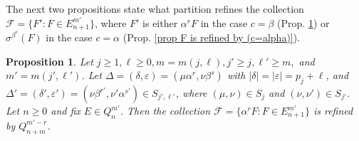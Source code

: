 \documentclass[12pt]{amsart}
\newcommand{\mc}[1]{\mathcal{#1}}
\newcommand{\al}{\alpha}
\newcommand{\be}{\beta}
\newcommand{\de}{\delta}
\newcommand{\De}{\Delta}
\newcommand{\ep}{\varepsilon}
\newcommand{\si}{\sigma}
\theoremstyle{plain} %
\newtheorem{Proposition}[Theorem]{Proposition}
\theoremstyle{definition} %
\begin{document}
The next two propositions state what partition refines the collection $\mc{F} = \{ F' : F \in E_{n+1}^{m'} \}$, where $F'$ is either $\al^r F$ in the case $c = \be$ (Prop. \ref{prop F is refined by (c=beta)}) or $\si^{\be^s} (F)$  in the case $c = \al$ (Prop. \ref{prop F is refined by (c=alpha)}).

\begin{Proposition}\label{prop F is refined by (c=beta)}
    Let $j \geq 1, \ell \geq 0, m = m(j,\ell), j' \geq j, \ell' \ge m,$ and $m' = m(j', \ell')$. Let $\De = (\de, \ep) =(\mu\al^r, \nu\be^s) $ with $|\de| = |\ep| = p_j + \ell$, and $\De' = (\de', \ep') = (\nu\be^{r'}, \nu' \al^{s'}) \in S_{j',\ell'}$, where $(\mu, \nu) \in S_j$ and $(\nu, \nu') \in S_{j'}$. Let $n \geq 0$ and fix $E \in Q_n^{m'}$.  Then the collection $\mc{F} = \{\al^r F : F \in E_{n+1}^{m'} \}$ is refined by $Q_{n+m}^{m'-r}$.
\end{Proposition}
\end{document}
